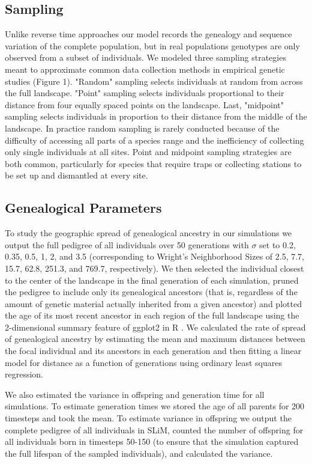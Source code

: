 \documentclass[9pt,twocolumn,twoside,lineno]{gsajnl}
\begin{document}
\subsection{Sampling}
Unlike reverse time approaches our model records the genealogy and sequence variation of the complete population, but in real populations genotypes are only observed from a subset of individuals. We modeled three sampling strategies meant to approximate common data collection methods in empirical genetic studies (Figure 1). "Random" sampling selects individuals at random from across the full landscape. "Point" sampling selects individuals proportional to their distance from four equally spaced points on the landscape. Last, "midpoint" sampling selects individuals in proportion to their distance from the middle of the landscape. In practice random sampling is rarely conducted because of the difficulty of accessing all parts of a species range and the inefficiency of collecting only single individuals at all sites. Point and midpoint sampling strategies are both common, particularly for species that require traps or collecting stations to be set up and dismantled at every site.  

\subsection{Genealogical Parameters}
To study the geographic spread of genealogical ancestry in our simulations we output the full pedigree of all individuals over 50 generations with $\sigma$ set to 0.2, 0.35, 0.5, 1, 2, and 3.5 (corresponding to Wright's Neighborhood Sizes of 2.5, 7.7, 15.7, 62.8, 251.3, and 769.7, respectively). We then selected the individual closest to the center of the landscape in the final generation of each simulation, pruned the pedigree to include only its genealogical ancestors (that is, regardless of the amount of genetic material actually inherited from a given ancestor) and plotted the age of its most recent ancestor in each region of the full landscape using the 2-dimensional summary feature of ggplot2 in R \citep{Wickham2016}. We calculated the rate of spread of genealogical ancestry by estimating the mean and maximum distances between the focal individual and its ancestors in each generation and then fitting a linear model for distance as a function of generations using ordinary least squares regression. 

We also estimated the variance in offspring and generation time for all simulations. To estimate generation times we stored the age of all parents for 200 timesteps and took the mean. To estimate variance in offspring we output the complete pedigree of all individuals in SLiM, counted the number of offspring for all individuals born in timesteps 50-150 (to ensure that the simulation captured the full lifespan of the sampled individuals), and calculated the variance. 
\end{document}
